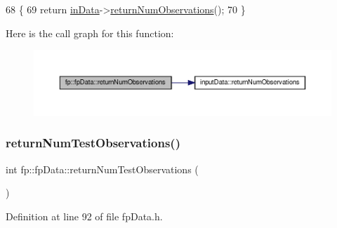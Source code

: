 \begin{DoxyCode}
68                                               \{
69                 \textcolor{keywordflow}{return} \hyperlink{classfp_1_1fpData_a49d7c3f58bcf88843c25b1b0c9714ebe}{inData}->\hyperlink{classinputData_af2ac0a8c7e0bfcdf1de1ea521eadc7af}{returnNumObservations}();
70             \}
\end{DoxyCode}
Here is the call graph for this function\+:\nopagebreak
\begin{figure}[H]
\begin{center}
\leavevmode
\includegraphics[width=350pt]{classfp_1_1fpData_a9056a8c0e7e48fe9aa591269064ecc43_cgraph}
\end{center}
\end{figure}
\mbox{\label{classfp_1_1fpData_a9a115d29fafb6e5b941f4e0c860e65e7}} 
\subsubsection{\texorpdfstring{return\+Num\+Test\+Observations()}{returnNumTestObservations()}}
{\footnotesize\ttfamily int fp\+::fp\+Data\+::return\+Num\+Test\+Observations (\begin{DoxyParamCaption}{ }\end{DoxyParamCaption})\hspace{0.3cm}{\ttfamily [inline]}}



Definition at line 92 of file fp\+Data.\+h.


